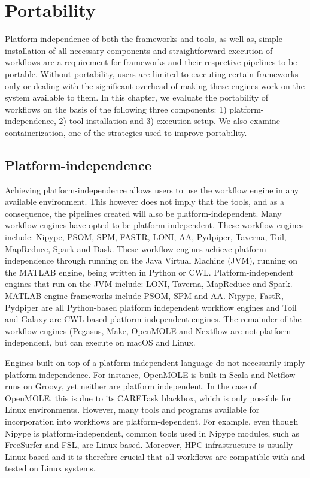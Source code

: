     \section{Portability}\label{portability}
        Platform-independence of both 
        the frameworks and tools, as well as, simple installation of all 
        necessary components and straightforward execution of workflows are a 
        requirement for frameworks and their respective pipelines to be 
        portable. Without portability, users are limited to executing certain
        frameworks only or dealing with the significant overhead of making 
        these engines work on the system available to them. In this chapter, 
        we evaluate the portability of workflows on the basis of the following
        three components: 1) platform-independence, 2) tool installation and
        3) execution setup. We also examine containerization, one of the 
        strategies used to improve portability.

        \subsection{Platform-independence}
            Achieving platform-independence allows users to use the workflow 
            engine in any available environment. This however does not imply 
            that the tools, and as a consequence, the pipelines created will
            also be platform-independent. Many workflow engines have opted to 
            be platform independent. These workflow engines include: Nipype,
            PSOM, SPM, FASTR, LONI, AA, Pydpiper, Taverna, Toil, MapReduce, Spark and
            Dask. These workflow engines achieve platform independence through
            running on the Java Virtual Machine (JVM), running on the MATLAB
            engine, being written in 
            Python or CWL. Platform-independent engines that run on the JVM include: 
            LONI, Taverna, MapReduce and Spark. MATLAB engine frameworks include PSOM, SPM and AA. 
            Nipype, FastR, Pydpiper are all Python-based platform 
            independent workflow engines and Toil and Galaxy are CWL-based 
            platform independent engines. 
            The remainder of the 
            workflow engines (Pegasus, Make, OpenMOLE and Nextflow are 
            not platform-independent, but can execute on macOS and Linux.

            Engines built on top of a platform-independent language do not 
            necessarily imply platform independence. For instance, OpenMOLE is 
            built in Scala and Netflow runs on Groovy, yet neither are platform
            independent. In the case of OpenMOLE, this is due to its CARETask
            blackbox, which is only possible for Linux environments. However,
            many tools and programs available for incorporation into workflows
            are platform-dependent. For example, even though Nipype is 
            platform-independent, common tools used in Nipype modules, such as 
            FreeSurfer and FSL, are Linux-based. Moreover, HPC infrastructure 
            is usually Linux-based and it is therefore crucial that all 
            workflows are compatible with and tested on Linux systems.
             
